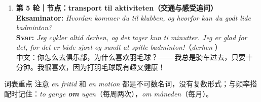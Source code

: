 \begin{enumerate}
  \item \textbf{\color{NCDRed}第 5 轮｜节点：transport til aktiviteten（交通与感受追问）}\\
    \textbf{Eksaminator:} \textit{Hvordan kommer du til klubben, og hvorfor kan du godt lide badminton?}\\
    \textbf{Svar:} \textit{Jeg cykler altid derhen, og det tager kun ti minutter. Jeg er glad for det, for det er både sjovt og sundt at spille badminton!}（\textit{derhen} ）\\
    {\small\textcolor{NCDGray}{中文：你怎么去俱乐部，为什么喜欢羽毛球？—— 我总是骑车过去，只要十分钟。我很喜欢，因为打羽毛球既有趣又健康！}}
\end{enumerate}


\begin{tipbox}{词表重点}
注意 \textit{en fritid} 和 \textit{en motion} 都是不可数名词，没有复数形式；与频率搭配时记住：\textit{to gange \textbf{om} ugen}（每周两次），\textit{om måneden}（每月）。
\end{tipbox}

